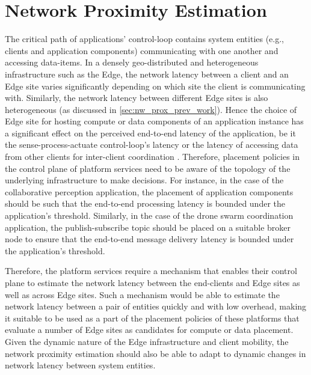 \section{Network Proximity Estimation}
The critical path of applications' control-loop contains system entities (e.g., clients and application components) communicating with one another and accessing data-items. In a densely geo-distributed and heterogeneous infrastructure such as the Edge, the network latency between a client and an Edge site varies significantly depending on which site the client is communicating with. Similarly, the network latency between different Edge sites is also heterogeneous (as discussed in \cref{sec:nw_prox_prev_work}). Hence the choice of Edge site for hosting compute or data components of an application instance has a significant effect on the perceived end-to-end latency of the application, be it the sense-process-actuate control-loop's latency or the latency of accessing data from other clients for inter-client coordination \cite{sarkar2016theoretical,amarasinghe2018data,naas2017ifogstor,liu2019mobility}. Therefore, placement policies in the control plane of platform services need to be aware of the topology of the underlying infrastructure to make decisions. For instance, in the case of the collaborative perception application, the placement of application components should be such that the end-to-end processing latency is bounded under the application's  threshold. Similarly, in the case of the drone swarm coordination application, the publish-subscribe topic should be placed on a suitable broker node to ensure that the end-to-end message delivery latency is bounded under the application's threshold.  
\par Therefore, the platform services require a mechanism that enables their control plane to estimate the network latency between the end-clients and Edge sites as well as across Edge sites. Such a mechanism would be able to estimate the network latency between a pair of entities quickly and with low overhead, making it suitable to be used as a part of the placement policies of these platforms that evaluate a number of Edge sites as candidates for compute or data placement. Given the dynamic nature of the Edge infrastructure and client mobility, the network proximity estimation should also be able to adapt to dynamic changes in network latency between system entities.

